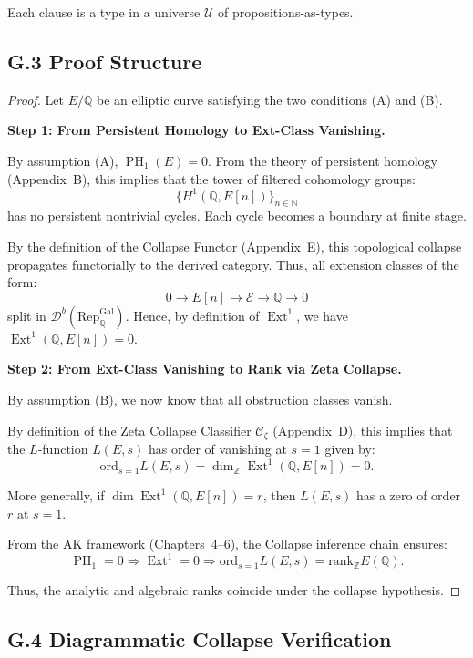 \documentclass[11pt]{article}
\DeclareMathOperator{\Ext}{Ext}
\DeclareMathOperator{\PH}{PH}
\newcommand{\QQ}{\mathbb{Q}}
\newcommand{\ZZ}{\mathbb{Z}}
\begin{document}
Each clause is a type in a universe $\mathcal{U}$ of propositions-as-types.

\subsection*{G.3 Proof Structure}

\begin{proof}
Let $E/\QQ$ be an elliptic curve satisfying the two conditions (A) and (B).

\vspace{1em}
\noindent \textbf{Step 1: From Persistent Homology to Ext-Class Vanishing.}

By assumption (A), $\PH_1(E) = 0$.  
From the theory of persistent homology (Appendix~B), this implies that the tower of filtered cohomology groups:
\[
\{H^1(\QQ, E[n])\}_{n \in \mathbb{N}}
\]
has no persistent nontrivial cycles. Each cycle becomes a boundary at finite stage.

By the definition of the Collapse Functor (Appendix~E), this topological collapse propagates functorially to the derived category.  
Thus, all extension classes of the form:
\[
0 \to E[n] \to \mathcal{E} \to \QQ \to 0
\]
split in $\mathcal{D}^b(\mathrm{Rep}_{\QQ}^{\mathrm{Gal}})$.  
Hence, by definition of $\Ext^1$, we have $\Ext^1(\QQ,E[n]) = 0$.

\vspace{1em}
\noindent \textbf{Step 2: From Ext-Class Vanishing to Rank via Zeta Collapse.}

By assumption (B), we now know that all obstruction classes vanish.

By definition of the Zeta Collapse Classifier $\mathcal{C}_\zeta$ (Appendix~D),  
this implies that the $L$-function $L(E,s)$ has order of vanishing at $s=1$ given by:
\[
\mathrm{ord}_{s=1} L(E,s) = \dim_{\ZZ} \Ext^1(\QQ, E[n]) = 0.
\]

More generally, if $\dim \Ext^1(\QQ,E[n]) = r$, then $L(E,s)$ has a zero of order $r$ at $s = 1$.

From the AK framework (Chapters~4--6), the Collapse inference chain ensures:
\[
\PH_1 = 0 \Rightarrow \Ext^1 = 0 \Rightarrow \mathrm{ord}_{s=1} L(E,s) = \mathrm{rank}_{\ZZ} E(\QQ).
\]

Thus, the analytic and algebraic ranks coincide under the collapse hypothesis.
\end{proof}

\subsection*{G.4 Diagrammatic Collapse Verification}
\end{document}
